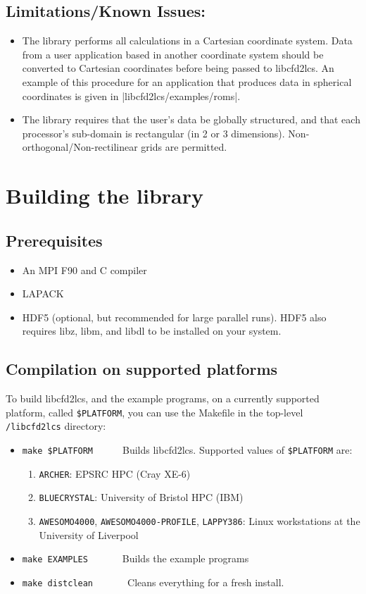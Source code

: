 \documentclass[letterpaper,11pt]{article}
\begin{document}
\subsection*{Limitations/Known Issues:}
\begin{itemize}
 \item The library performs all calculations in a Cartesian coordinate system.  Data from a user application based in another coordinate system should be converted to Cartesian coordinates before being passed to libcfd2lcs.  An example of this procedure for an application that produces data in spherical coordinates is given in \spverb|libcfd2lcs/examples/roms|.  
 \item The library requires that the user's data be globally structured, and that each processor's sub-domain is rectangular (in 2 or 3 dimensions).  Non-orthogonal/Non-rectilinear grids are permitted.
\end{itemize}

\section{Building the library}
\subsection*{Prerequisites}
\begin{itemize}
\item An MPI F90 and C compiler
\item LAPACK
\item HDF5 (optional, but recommended for large parallel runs).  HDF5 also requires libz, libm, and libdl to be installed on your system.
\end{itemize}

\subsection*{Compilation on supported platforms}
To build libcfd2lcs, and the example programs, on a currently supported platform, called \verb|$PLATFORM|, you can use the Makefile in the top-level \verb|/libcfd2lcs| directory:
\begin{itemize}
 \item \verb|make $PLATFORM|~~~~~~Builds libcfd2lcs. Supported values of \verb|$PLATFORM| are:
 \begin{enumerate}
  \item \verb|ARCHER|: EPSRC HPC (Cray XE-6)
  \item \verb|BLUECRYSTAL|:  University of Bristol HPC (IBM)
  \item \verb|AWESOMO4000|, \verb|AWESOMO4000-PROFILE|, \verb|LAPPY386|:  Linux workstations at the University of Liverpool
 \end{enumerate}
 \item \verb|make EXAMPLES|~~~~~~~Builds the example programs
 \item \verb|make distclean|~~~~~~~Cleans everything for a fresh install.
\end{itemize}
\end{document}
